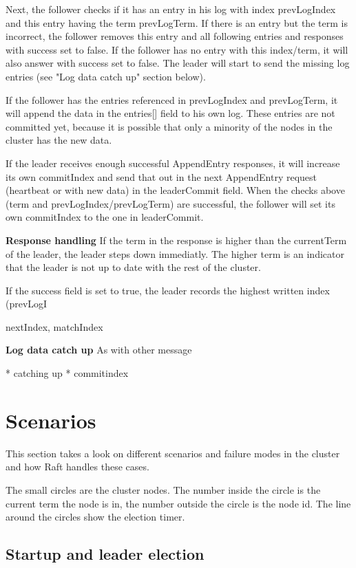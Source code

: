 Next, the follower checks if it has an entry in his log with index prevLogIndex and this entry having the term prevLogTerm.
If there is an entry but the term is incorrect, the follower removes this entry and all following entries and responses
with success set to false. If the follower has no entry with this index/term, it will also answer with success set to false.
The leader will start to send the missing log entries (see "Log data catch up" section below).

If the follower has the entries referenced in prevLogIndex and prevLogTerm, it will append the data in the entries[] field to his
own log. These entries are not committed yet, because it is possible that only a minority of the nodes in the cluster has the new data.

If the leader receives enough successful AppendEntry responses, it will increase its own commitIndex and send that out in the next
AppendEntry request (heartbeat or with new data) in the leaderCommit field. When the checks above (term and prevLogIndex/prevLogTerm)
are successful, the follower will set its own commitIndex to the one in leaderCommit.

\textbf{Response handling}
If the term in the response is higher than the currentTerm of the leader, the leader steps down immediatly. The higher term
is an indicator that the leader is not up to date with the rest of the cluster.

If the success field is set to true, the leader records the highest written index (prevLogI


nextIndex, matchIndex



\textbf{Log data catch up}
As with other message

* catching up
* commitindex

\section{Scenarios}
This section takes a look on different scenarios and failure modes in the cluster and how Raft handles these cases.

The small circles are the cluster nodes. The number inside the circle is the current term the node is in, the number outside the circle is the node id. The line around the circles show the election timer.

\subsection{Startup and leader election}


